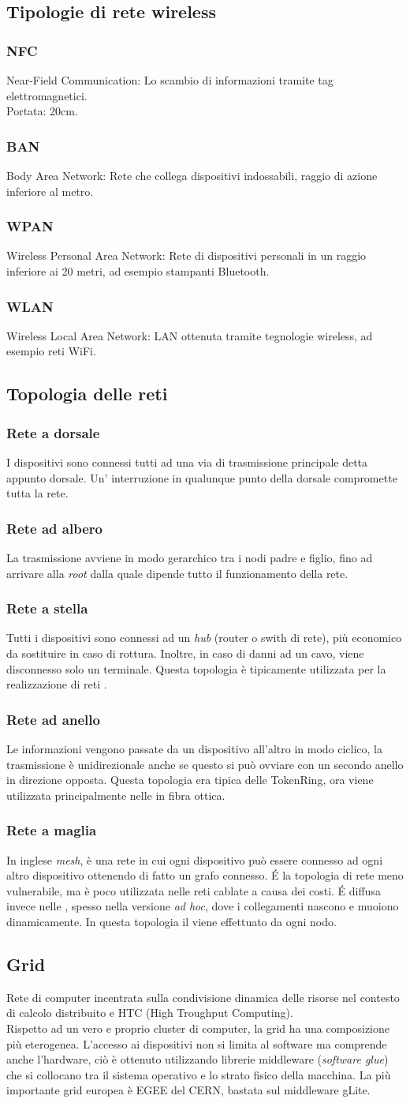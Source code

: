 \documentclass[a4paper,11pt]{article}
\def\sub#1{\subsection{#1}\label{#1}}
\def\subsub#1{\subsubsection{#1}\label{#1}}
\def\vedi#1{\nameref{#1}}
\def\italic#1{\textit{#1}}
\begin{document}
\sub{Tipologie di rete wireless}
\subsub{NFC} Near-Field Communication: Lo scambio di informazioni tramite tag elettromagnetici.\\ Portata: 20cm.
\subsub{BAN} Body Area Network: Rete che collega dispositivi indossabili, raggio di azione inferiore al metro.
\subsub{WPAN} Wireless Personal Area Network: Rete di dispositivi personali in un raggio inferiore ai 20 metri, ad esempio stampanti Bluetooth.
\subsub{WLAN} Wireless Local Area Network: LAN ottenuta tramite tegnologie wireless, ad esempio reti WiFi. 

\newpage
\sub{Topologia delle reti}
\subsub{Rete a dorsale}
I dispositivi sono connessi tutti ad una via di trasmissione principale detta appunto dorsale. Un' interruzione in qualunque punto della dorsale compromette tutta la rete.
\subsub{Rete ad albero} La trasmissione avviene in modo gerarchico tra i nodi padre e figlio, fino ad arrivare alla \textit{root} dalla quale dipende tutto il funzionamento della rete.
\subsub{Rete a stella} Tutti i dispositivi sono connessi ad un \italic{hub} (router o swith di rete), più economico da sostituire in caso di rottura. Inoltre, in caso di danni ad un cavo, viene disconnesso solo un terminale. Questa topologia è tipicamente utilizzata per la realizzazione di reti \vedi{LAN}. 
\subsub{Rete ad anello} Le informazioni vengono passate da un dispositivo all'altro in modo ciclico, la trasmissione è unidirezionale anche se questo si può ovviare con un secondo anello in direzione opposta. Questa topologia era tipica delle \vedi{LAN} TokenRing, ora viene utilizzata principalmente nelle \vedi{MAN} in fibra ottica.
\subsub{Rete a maglia} In inglese \textit{mesh}, è una rete in cui ogni dispositivo può essere connesso ad ogni altro dispositivo ottenendo di fatto un grafo connesso. \'E la topologia di rete meno vulnerabile, ma è poco utilizzata nelle reti cablate a causa dei costi. \'E diffusa invece nelle \vedi{WLAN}, spesso nella versione \textit{ad hoc}, dove i collegamenti nascono e muoiono dinamicamente. In questa topologia il \vedi{Routing} viene effettuato da ogni nodo.

\sub{Grid}
Rete di computer incentrata sulla condivisione dinamica delle risorse nel contesto di calcolo distribuito e HTC (High Troughput Computing).\\ Rispetto ad un vero e proprio cluster di computer, la grid ha una composizione più eterogenea. L'accesso ai dispositivi non si limita al software ma comprende anche l'hardware, ciò è ottenuto utilizzando librerie middleware (\textit{software glue}) che si collocano tra il sistema operativo e lo strato fisico della macchina. La più importante grid europea è EGEE del CERN, bastata sul middleware gLite.%
 
\end{document}
